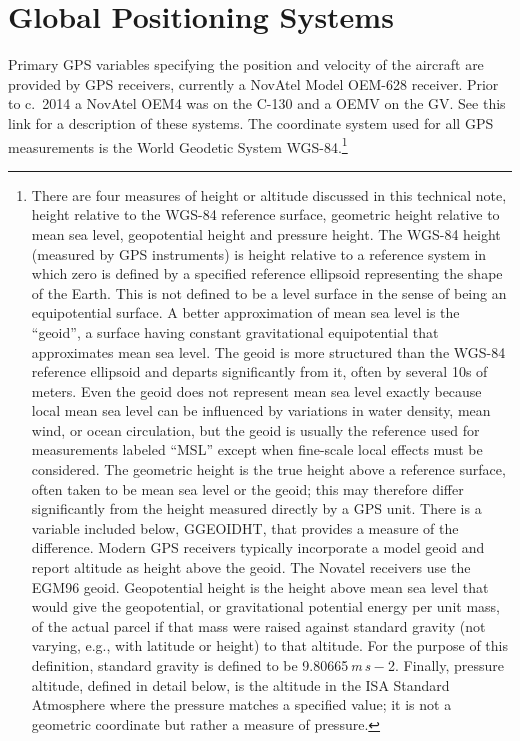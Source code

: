 \documentclass[
]{book}
\begin{document}
\hypertarget{global-positioning-systems}{%
\section{Global Positioning Systems}\label{global-positioning-systems}}

Primary GPS variables specifying the position and velocity of the aircraft are provided by GPS receivers, currently a NovAtel Model OEM-628 receiver. Prior to c.~2014 a NovAtel OEM4 was on the C-130 and a OEMV on the GV. See this link for a description of these systems. The coordinate system used for all GPS measurements is the World Geodetic System WGS-84.\footnote{There are four measures of height or altitude discussed in this technical note, height relative to the WGS-84 reference surface, geometric height relative to mean sea level, geopotential height and pressure height. The WGS-84 height (measured by GPS instruments) is height relative to a reference system in which zero is defined by a specified reference ellipsoid representing the shape of the Earth. This is not defined to be a level surface in the sense of being an equipotential surface. A better approximation of mean sea level is the ``geoid'', a surface having constant gravitational equipotential that approximates mean sea level. The geoid is more structured than the WGS-84 reference ellipsoid and departs significantly from it, often by several 10s of meters. Even the geoid does not represent mean sea level exactly because local mean sea level can be influenced by variations in water density, mean wind, or ocean circulation, but the geoid is usually the reference used for measurements labeled ``MSL'' except when fine-scale local effects must be considered. The geometric height is the true height above a reference surface, often taken to be mean sea level or the geoid; this may therefore differ significantly from the height measured directly by a GPS unit. There is a variable included below, GGEOIDHT, that provides a measure of the difference. Modern GPS receivers typically incorporate a model geoid and report altitude as height above the geoid. The Novatel receivers use the EGM96 geoid. Geopotential height is the height above mean sea level that would give the geopotential, or gravitational potential energy per unit mass, of the actual parcel if that mass were raised against standard gravity (not varying, e.g., with latitude or height) to that altitude. For the purpose of this definition, standard gravity is defined to be 9.80665{ \emph{m} \emph{s} − 2}. Finally, pressure altitude, defined in detail below, is the altitude in the ISA Standard Atmosphere where the pressure matches a specified value; it is not a geometric coordinate but rather a measure of pressure.}
\end{document}
